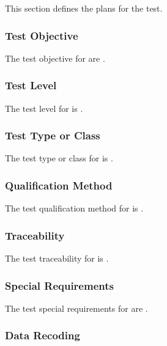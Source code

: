 


This section defines the plans for the \TestIdName\xspace test.

\subsubsection{Test Objective}
\label{loc:TestObjective\TestIdName}

The test objective for \TestIdName\xspace are \TBD.

\subsubsection{Test Level}
\label{loc:TestLevels\TestIdName}

The test level for \TestIdName\xspace is \TBD.

\subsubsection{Test Type or Class}
\label{loc:TestLevels\TestIdName}

The test type or class for \TestIdName\xspace is \TBD.

\subsubsection{Qualification Method}
\label{loc:TestQualificationMethod\TestIdName}

The test qualification method for \TestIdName\xspace is \TBD.

\subsubsection{Traceability}
\label{loc:TestTraceability\TestIdName}

The test traceability for \TestIdName\xspace is \TBD.

\subsubsection{Special Requirements}
\label{loc:TestSpecialRequirements\TestIdName}

The test special requirements for \TestIdName\xspace are \TBD.

\subsubsection{Data Recoding}
\label{loc:TestDataRecoding\TestIdName}

